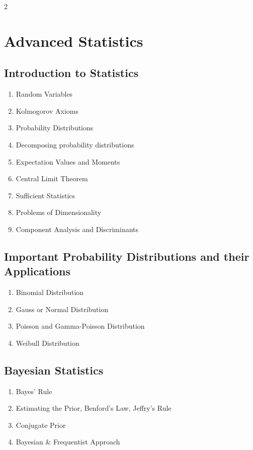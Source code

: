 \documentclass[8pt]{extarticle}
\begin{document}
\begin{multicols}{2}
    \section{Advanced Statistics}
    \subsection{Introduction to Statistics}
    \begin{enumerate}[label*=\arabic*.]
        \item Random Variables
        \item Kolmogorov Axioms
        \item Probability Distributions
        \item Decomposing probability distributions
        \item Expectation Values and Moments
        \item Central Limit Theorem
        \item Sufficient Statistics
        \item Problems of Dimensionality
        \item Component Analysis and Discriminants
    \end{enumerate}
    \subsection{Important Probability Distributions and their Applications}
    \begin{enumerate}[label*=\arabic*.]
        \item Binomial Distribution
        \item Gauss or Normal Distribution
        \item Poisson and Gamma-Poisson Distribution
        \item Weibull Distribution
    \end{enumerate}
    \subsection{Bayesian Statistics}
    \begin{enumerate}[label*=\arabic*.]
        \item Bayes’ Rule
        \item Estimating the Prior, Benford’s Law, Jeffry’s Rule
        \item Conjugate Prior
        \item Bayesian \& Frequentist Approach
    \end{enumerate}

\end{multicols}
\end{document}
